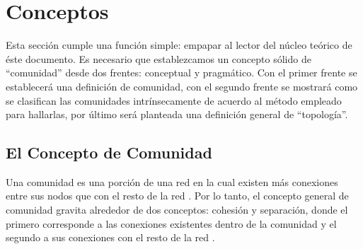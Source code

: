 \documentclass[12pt,letter]{article}
\begin{document}
\vspace{0.5cm}




\section{Conceptos}
Esta sección cumple una función simple: empapar al lector del núcleo teórico de éste documento. Es necesario que establezcamos un concepto sólido de ``comunidad'' desde dos frentes: conceptual y pragmático. Con el primer frente se establecerá una definición de comunidad, con el segundo frente se mostrará como se clasifican las comunidades intrínsecamente de acuerdo al método empleado para hallarlas, por último será planteada una definición general de ``topología''.

\subsection{El Concepto de Comunidad} \label{ComuCo}
Una comunidad es una porción de una red en la cual existen más conexiones entre sus nodos que con el resto de la red \citep{Labatut, Leskovec2}. Por lo tanto, el concepto general de comunidad gravita alrededor de dos conceptos: cohesión y separación, donde el primero corresponde a las conexiones existentes dentro de la comunidad y el segundo a sus conexiones con el resto de la red \citep{Leskovec2}.
\end{document}

